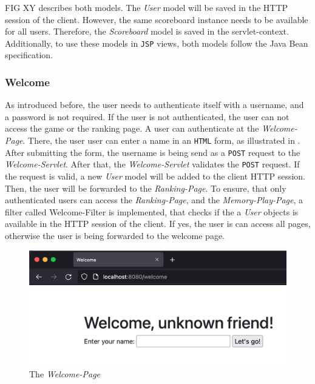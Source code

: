 FIG XY describes both models. The \textit{User} model will be saved in the HTTP session of the client. However, the same scoreboard instance needs to be available for all users. Therefore, the \textit{Scoreboard} model is saved in the servlet-context.
Additionally, to use these models in \texttt{JSP} views, both models follow the Java Bean specification.

\subsubsection{Welcome}\label{subsubsec:03_impl_backend_welcome}
As introduced before, the user needs to authenticate itself with a username, and a password is not required. If the user is not authenticated, the user can not access the game or the ranking page.
A user can authenticate at the \textit{Welcome-Page}. There, the user user can enter a name in an \texttt{HTML} form, as illustrated in . After submitting the form, the username is being send as a \texttt{POST} request to the \textit{Welcome-Servlet}. After that, the \textit{Welcome-Servlet} validates the \texttt{POST} request. If the request is valid, a new \textit{User} model will be added to the client HTTP session. Then, the user will be forwarded to the \textit{Ranking-Page}.
To ensure, that only authenticated users can access the \textit{Ranking-Page}, and the \textit{Memory-Play-Page}, a filter called Welcome-Filter is implemented, that checks if the a \textit{User} objects is available in the HTTP session of the client. If yes, the user is can access all pages, otherwise the user is being forwarded to the welcome page.
\begin{figure}[h]
\centering
\includegraphics[scale=0.4]{images/03_impl/welcome/welcome-page}
\caption{The \textit{Welcome-Page}}
\label{fig:03_impl_backend_welcome_page}
\end{figure}

